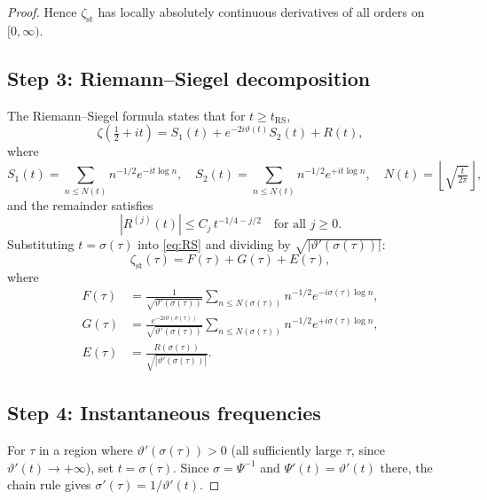 \documentclass[11pt]{article}
\theoremstyle{definition}
\begin{document}
\begin{proof}
Hence $\zeta_{\mathrm{st}}$ has locally absolutely continuous
derivatives of all orders on $[0,\infty)$.

\subsection*{Step 3: Riemann--Siegel decomposition}

The Riemann--Siegel formula states that for $t\ge t_{\mathrm{RS}}$,
\begin{equation}\label{eq:RS}
\zeta\!\left(\tfrac12+it\right)
=S_1(t)+e^{-2i\vartheta(t)}S_2(t)+R(t),
\end{equation}
where
\[
S_1(t)=\sum_{n\le N(t)}n^{-1/2}e^{-it\log n},\quad
S_2(t)=\sum_{n\le N(t)}n^{-1/2}e^{+it\log n},\quad
N(t)=\left\lfloor\sqrt{\tfrac{t}{2\pi}}\right\rfloor,
\]
and the remainder satisfies
\begin{equation}\label{eq:Rbound}
\left|R^{(j)}(t)\right|\le C_j\,t^{-1/4-j/2}
\quad\text{for all }j\ge 0.
\end{equation}
Substituting $t=\sigma(\tau)$ into \eqref{eq:RS} and dividing by
$\sqrt{|\vartheta'(\sigma(\tau))|}$:
\begin{equation}\label{eq:zst_decomp}
\zeta_{\mathrm{st}}(\tau)=F(\tau)+G(\tau)+E(\tau),
\end{equation}
where
\begin{align}
F(\tau)
&=\frac{1}{\sqrt{\vartheta'(\sigma(\tau))}}
  \sum_{n\le N(\sigma(\tau))}n^{-1/2}e^{-i\sigma(\tau)\log n},
\label{eq:F_def}\\
G(\tau)
&=\frac{e^{-2i\vartheta(\sigma(\tau))}}{\sqrt{\vartheta'(\sigma(\tau))}}
  \sum_{n\le N(\sigma(\tau))}n^{-1/2}e^{+i\sigma(\tau)\log n},
\label{eq:G_def}\\
E(\tau)
&=\frac{R(\sigma(\tau))}{\sqrt{|\vartheta'(\sigma(\tau))|}}.
\label{eq:E_def}
\end{align}

\subsection*{Step 4: Instantaneous frequencies}

For $\tau$ in a region where $\vartheta'(\sigma(\tau))>0$ (all
sufficiently large $\tau$, since $\vartheta'(t)\to+\infty$), set
$t=\sigma(\tau)$.  Since $\sigma=\Psi^{-1}$ and $\Psi'(t)=\vartheta'(t)$
there, the chain rule gives $\sigma'(\tau)=1/\vartheta'(t)$.


\end{proof}
\end{document}
